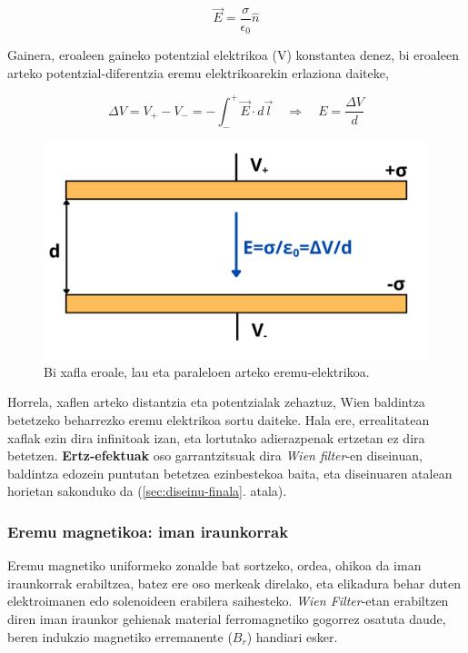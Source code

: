 \documentclass[12pt]{article}
\numberwithin{figure}{section}
\numberwithin{equation}{section}
\begin{document}
\begin{equation}
    \vec{E} = \frac{\sigma}{\epsilon_0}\hat{n}
\end{equation}

Gainera, eroaleen gaineko potentzial elektrikoa (V) konstantea denez, bi eroaleen arteko potentzial-diferentzia eremu elektrikoarekin erlaziona daiteke,

\begin{equation}
    \Delta V = V_{+} - V_{-} = -\int_{-}^+ \vec{E} \cdot d \vec{l} \quad \Longrightarrow \quad  \boxed{E=\frac{\Delta V}{d}}
    \label{eq:eremue_paralelo}
\end{equation}

\begin{figure}[h]
    \centering
    \includegraphics[width=0.7\linewidth]{2 - Oinarri teorikoa/parallel_plate.png}
    \caption{Bi xafla eroale, lau eta paraleloen arteko eremu-elektrikoa.}
    \label{fig:eroaleparalelo}
\end{figure}

Horrela, xaflen arteko distantzia eta potentzialak zehaztuz, Wien baldintza betetzeko beharrezko eremu elektrikoa sortu daiteke. Hala ere, errealitatean xaflak ezin dira infinitoak izan, eta lortutako adierazpenak ertzetan ez dira betetzen. \textbf{Ertz-efektuak} oso garrantzitsuak dira \textit{Wien filter}-en diseinuan, baldintza edozein puntutan betetzea ezinbestekoa baita, eta diseinuaren atalean horietan sakonduko da (\ref{sec:diseinu-finala}. atala).
\subsubsection{Eremu magnetikoa: iman iraunkorrak}
\label{sec:iman_iraunkorrak}

Eremu magnetiko uniformeko zonalde bat sortzeko, ordea, ohikoa da iman iraunkorrak erabiltzea, batez ere oso merkeak direlako, eta elikadura behar duten elektroimanen edo solenoideen erabilera saihesteko. \textit{Wien Filter}-etan erabiltzen diren iman iraunkor gehienak material ferromagnetiko gogorrez osatuta daude, beren indukzio magnetiko erremanente ($B_r$) handiari esker.\\
\end{document}
